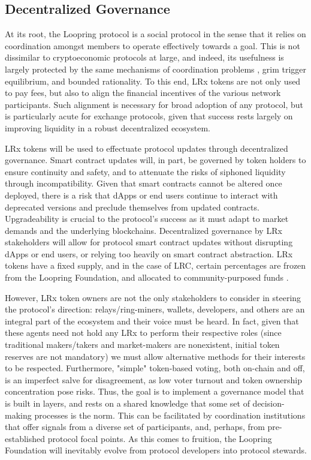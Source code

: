 \documentclass[UTF8,nofonts]{article}
\begin{document}
\begin{multicols}{2}
\begin{enumerate}
\subsection{Decentralized Governance}
At its root, the Loopring protocol is a social protocol in the sense that it relies on coordination amongst members to operate effectively towards a goal. This is not dissimilar to cryptoeconomic protocols at large, and indeed, its usefulness is largely protected by the same mechanisms of coordination problems \cite{vitalikgovernance}, grim trigger equilibrium, and bounded rationality. To this end, LRx tokens are not only used to pay fees, but also to align the financial incentives of the various network participants. Such alignment is necessary for broad adoption of any protocol, but is particularly acute for exchange protocols, given that success rests largely on improving liquidity in a robust decentralized ecosystem.

LRx tokens will be used to effectuate protocol updates through decentralized governance. Smart contract updates will, in part, be governed by token holders to ensure continuity and safety, and to attenuate the risks of siphoned liquidity through incompatibility. Given that smart contracts cannot be altered once deployed, there is a risk that dApps or end users continue to interact with deprecated versions and preclude themselves from updated contracts. Upgradeability is crucial to the protocol's success as it must adapt to market demands and the underlying blockchains. Decentralized governance by LRx stakeholders will allow for protocol smart contract updates without disrupting dApps or end users, or relying too heavily on smart contract abstraction. LRx tokens have a fixed supply, and in the case of LRC, certain percentages are frozen from the Loopring Foundation, and allocated to community-purposed funds \cite{LRCtokendoc}.

However, LRx token owners are not the only stakeholders to consider in steering the protocol's direction: relays/ring-miners, wallets, developers, and others are an integral part of the ecosystem and their voice must be heard. In fact, given that these agents need not hold any LRx to perform their respective roles (since traditional makers/takers and market-makers are nonexistent, initial token reserves are not mandatory) we must allow alternative methods for their interests to be respected. Furthermore, "simple" token-based voting, both on-chain and off, is an imperfect salve for disagreement, as low voter turnout and token ownership concentration pose risks. Thus, the goal is to implement a governance model that is built in layers, and rests on a shared knowledge that some set of decision-making processes is the norm. This can be facilitated by coordination institutions that offer signals from a diverse set of participants, and, perhaps, from pre-established protocol focal points. As this comes to fruition, the Loopring Foundation will inevitably evolve from protocol developers into protocol stewards.


\end{enumerate}
\end{multicols}
\end{document}
